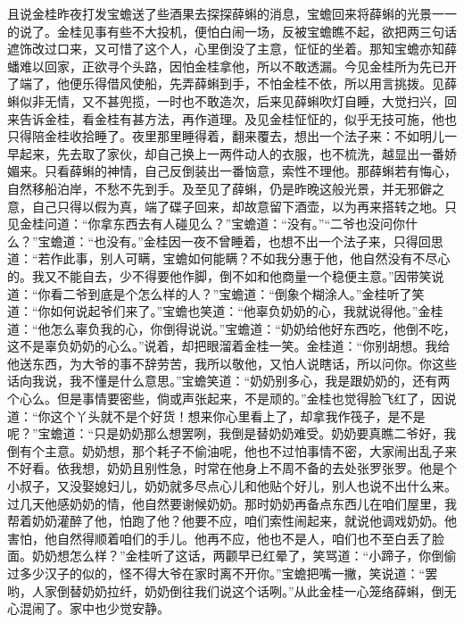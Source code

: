\begin{parag}
    且说金桂昨夜打发宝蟾送了些酒果去探探薛蝌的消息，宝蟾回来将薛蝌的光景一一的说了。金桂见事有些不大投机，便怕白闹一场，反被宝蟾瞧不起，欲把两三句话遮饰改过口来，又可惜了这个人，心里倒没了主意，怔怔的坐着。那知宝蟾亦知薛蟠难以回家，正欲寻个头路，因怕金桂拿他，所以不敢透漏。今见金桂所为先已开了端了，他便乐得借风使船，先弄薛蝌到手，不怕金桂不依，所以用言挑拨。见薛蝌似非无情，又不甚兜揽，一时也不敢造次，后来见薛蝌吹灯自睡，大觉扫兴，回来告诉金桂，看金桂有甚方法，再作道理。及见金桂怔怔的，似乎无技可施，他也只得陪金桂收拾睡了。夜里那里睡得着，翻来覆去，想出一个法子来：不如明儿一早起来，先去取了家伙，却自己换上一两件动人的衣服，也不梳洗，越显出一番娇媚来。只看薛蝌的神情，自己反倒装出一番恼意，索性不理他。那薛蝌若有悔心，自然移船泊岸，不愁不先到手。及至见了薛蝌，仍是昨晚这般光景，并无邪僻之意，自己只得以假为真，端了碟子回来，却故意留下酒壶，以为再来搭转之地。只见金桂问道：“你拿东西去有人碰见么？”宝蟾道：“没有。”“二爷也没问你什么？”宝蟾道：“也没有。”金桂因一夜不曾睡着，也想不出一个法子来，只得回思道：“若作此事，别人可瞒，宝蟾如何能瞒？不如我分惠于他，他自然没有不尽心的。我又不能自去，少不得要他作脚，倒不如和他商量一个稳便主意。”因带笑说道：“你看二爷到底是个怎么样的人？”宝蟾道：“倒象个糊涂人。”金桂听了笑道：“你如何说起爷们来了。”宝蟾也笑道：“他辜负奶奶的心，我就说得他。”金桂道：“他怎么辜负我的心，你倒得说说。”宝蟾道：“奶奶给他好东西吃，他倒不吃，这不是辜负奶奶的心么。”说着，却把眼溜着金桂一笑。金桂道：“你别胡想。我给他送东西，为大爷的事不辞劳苦，我所以敬他，又怕人说瞎话，所以问你。你这些话向我说，我不懂是什么意思。”宝蟾笑道：“奶奶别多心，我是跟奶奶的，还有两个心么。但是事情要密些，倘或声张起来，不是顽的。”金桂也觉得脸飞红了，因说道：“你这个丫头就不是个好货！想来你心里看上了，却拿我作筏子，是不是呢？”宝蟾道：“只是奶奶那么想罢咧，我倒是替奶奶难受。奶奶要真瞧二爷好，我倒有个主意。奶奶想，那个耗子不偷油呢，他也不过怕事情不密，大家闹出乱子来不好看。依我想，奶奶且别性急，时常在他身上不周不备的去处张罗张罗。他是个小叔子，又没娶媳妇儿，奶奶就多尽点心儿和他贴个好儿，别人也说不出什么来。过几天他感奶奶的情，他自然要谢候奶奶。那时奶奶再备点东西儿在咱们屋里，我帮着奶奶灌醉了他，怕跑了他？他要不应，咱们索性闹起来，就说他调戏奶奶。他害怕，他自然得顺着咱们的手儿。他再不应，他也不是人，咱们也不至白丢了脸面。奶奶想怎么样？”金桂听了这话，两颧早已红晕了，笑骂道：“小蹄子，你倒偷过多少汉子的似的，怪不得大爷在家时离不开你。”宝蟾把嘴一撇，笑说道：“罢哟，人家倒替奶奶拉纤，奶奶倒往我们说这个话咧。”从此金桂一心笼络薛蝌，倒无心混闹了。家中也少觉安静。
\end{parag}


